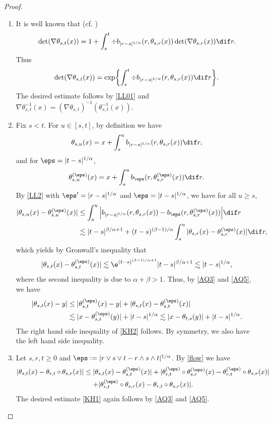 \begin{proof}
\begin{enumerate}
\item
It is well known that (cf. \cite[Prop.\,1.2]{MB02})
\[
\det(\nabla\theta_{s,t}(x))=1+\int^t_s\div b_{|r-s|^{1/\alpha}}(r,\theta_{s,r}(x))\det(\nabla\theta_{s,r}(x))\dif r.
\]
Thus
\[
\det(\nabla\theta_{s,t}(x))=\exp\biggl\{\int^t_s\div b_{|r-s|^{1/\alpha}}(r,\theta_{s,r}(x))\dif r\biggr\}.
\]
The desired estimate follows by \eqref{LL01} and $\nabla\theta^{-1}_{s,t}(x)=(\nabla\theta_{s,t})^{-1}(\theta^{-1}_{s,t}(x))$.

\item
Fix $s<t$. For $u\in[s,t]$, by definition we have
\[
\theta_{s,u}(x)=x+\int^u_sb_{|r-s|^{1/\alpha}}(r,\theta_{s,r}(x))\dif r,
\]
and for $\eps=|t-s|^{1/\alpha}$,
\[
\theta^{(\eps)}_{s,u}(x)=x+\int^u_sb_{\eps}(r,\theta^{(\eps)}_{s,r}(x))\dif r.
\]
By \eqref{LL2} with $\eps'=|r-s|^{1/\alpha}$ and $\eps=|t-s|^{1/\alpha}$, we have for all $u\ge s $,
\begin{align*}
|\theta_{s,u}(x)-\theta^{(\eps)}_{s,u}(x)|
&\le \int^u_s\Big|b_{|r-s|^{1/\alpha}}(r,\theta_{s,r}(x))-b_{\eps}(r,\theta^{(\eps)}_{s,r}(x))\Big|\dif r
\\&\lesssim |t-s|^{\beta/\alpha+1}+(t-s)^{(\beta-1)/\alpha}\int^u_s|\theta_{s,r}(x)-\theta^{(\eps)}_{s,r}(x)|\dif r,
\end{align*}
which yields by Gronwall's inequality that
\begin{equation}\label{AQ5}
|\theta_{s,t}(x)-\theta^{(\eps)}_{s,t}(x)|\lesssim\e^{(t-s)^{(\beta-1)/\alpha+1}} |t-s|^{\beta/\alpha+1}\lesssim |t-s|^{1/\alpha},
\end{equation}
where the second inequality is due to $\alpha+\beta>1$.
Thus, by \eqref{AQ3} and \eqref{AQ5}, we have
\begin{align*}
|\theta_{s,t}(x)-y|&\leq|\theta^{(\eps)}_{s,t}(x)-y|+|\theta_{s,t}(x)-\theta^{(\eps)}_{s,t}(x)|
\\&\lesssim |x-\theta^{(\eps)}_{s,t}(y)|+|t-s|^{1/\alpha}\lesssim |x-\theta_{t,s}(y)|+|t-s|^{1/\alpha}.
\end{align*}
The right hand side inequality of \eqref{KH2} follows. By symmetry, we also have the left hand side inequality.

\item
Let $s,r,t\geq 0$ and $\eps:=|r\vee s\vee t-r\wedge s\wedge t|^{1/\alpha}$. By \eqref{flow} we have
\begin{multline*}
|\theta_{s,t}(x)-\theta_{r,t}\circ\theta_{s,r}(x)|
\leq|\theta_{s,t}(x)-\theta^{(\eps)}_{s,t}(x)|
+|\theta^{(\eps)}_{r,t}\circ\theta^{(\eps)}_{s,r}(x)-\theta^{(\eps)}_{r,t}\circ\theta_{s,r}(x)|
\\+|\theta^{(\eps)}_{r,t}\circ\theta_{s,r}(x)-\theta_{r,t}\circ\theta_{s,r}(x)|.
\end{multline*}
The desired estimate \eqref{KH1} again follows by \eqref{AQ3} and \eqref{AQ5}.\qedhere
\end{enumerate}
\end{proof}
